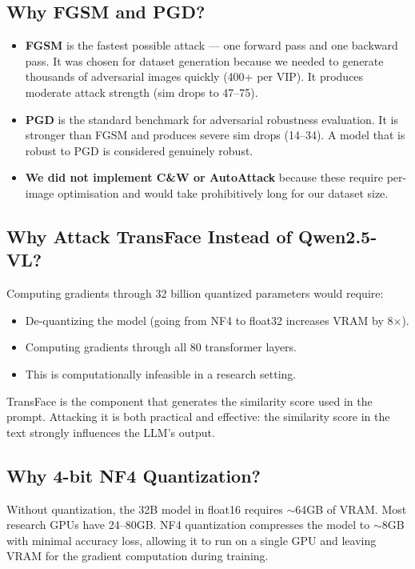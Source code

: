 \documentclass[12pt,a4paper]{article}
\begin{document}
\subsection{Why FGSM and PGD?}

\begin{itemize}
    \item \textbf{FGSM} is the fastest possible attack --- one forward pass and one backward pass. It was chosen for dataset generation because we needed to generate thousands of adversarial images quickly (400+ per VIP). It produces moderate attack strength (sim drops to 47--75).
    \item \textbf{PGD} is the standard benchmark for adversarial robustness evaluation. It is stronger than FGSM and produces severe sim drops (14--34). A model that is robust to PGD is considered genuinely robust.
    \item \textbf{We did not implement C\&W or AutoAttack} because these require per-image optimisation and would take prohibitively long for our dataset size.
\end{itemize}

\subsection{Why Attack TransFace Instead of Qwen2.5-VL?}

Computing gradients through 32 billion quantized parameters would require:
\begin{itemize}
    \item De-quantizing the model (going from NF4 to float32 increases VRAM by 8$\times$).
    \item Computing gradients through all 80 transformer layers.
    \item This is computationally infeasible in a research setting.
\end{itemize}

TransFace is the component that generates the similarity score used in the prompt. Attacking it is both practical and effective: the similarity score in the text strongly influences the LLM's output.

\subsection{Why 4-bit NF4 Quantization?}

Without quantization, the 32B model in float16 requires $\sim$64GB of VRAM. Most research GPUs have 24--80GB. NF4 quantization compresses the model to $\sim$8GB with minimal accuracy loss, allowing it to run on a single GPU and leaving VRAM for the gradient computation during training.
\end{document}
